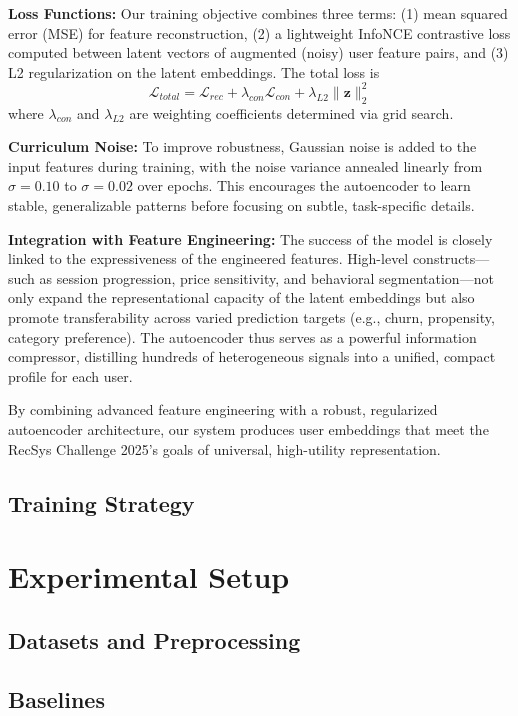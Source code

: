 \documentclass[sigconf]{acmart}
\begin{document}
\textbf{Loss Functions:}  
Our training objective combines three terms: (1) mean squared error (MSE) for feature reconstruction, (2) a lightweight InfoNCE contrastive loss computed between latent vectors of augmented (noisy) user feature pairs, and (3) L2 regularization on the latent embeddings. The total loss is  
\[
\mathcal{L}_{total} = \mathcal{L}_{rec} + \lambda_{con}\mathcal{L}_{con} + \lambda_{L2}\|\mathbf{z}\|_2^2
\]  
where $\lambda_{con}$ and $\lambda_{L2}$ are weighting coefficients determined via grid search.

\textbf{Curriculum Noise:}  
To improve robustness, Gaussian noise is added to the input features during training, with the noise variance annealed linearly from $\sigma=0.10$ to $\sigma=0.02$ over epochs. This encourages the autoencoder to learn stable, generalizable patterns before focusing on subtle, task-specific details.

\textbf{Integration with Feature Engineering:}  
The success of the model is closely linked to the expressiveness of the engineered features. High-level constructs—such as session progression, price sensitivity, and behavioral segmentation—not only expand the representational capacity of the latent embeddings but also promote transferability across varied prediction targets (e.g., churn, propensity, category preference). The autoencoder thus serves as a powerful information compressor, distilling hundreds of heterogeneous signals into a unified, compact profile for each user.

By combining advanced feature engineering with a robust, regularized autoencoder architecture, our system produces user embeddings that meet the RecSys Challenge 2025’s goals of universal, high-utility representation.



\subsection{Training Strategy}

\section{Experimental Setup}
\label{sec:experiments}
\subsection{Datasets and Preprocessing}
\subsection{Baselines}
\end{document}
